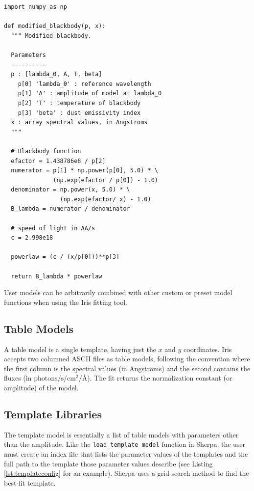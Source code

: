 \documentclass[preprint,authoryear,5p]{elsarticle}
\begin{document}
\begin{lstlisting}[style=python,
	caption={Example of a user-defined model that
can be dynamically loaded into Iris. The code, written as a Python function, 
implements a modified blackbody and can be combined 
in Iris with other built-in and custom components. Backslashes indicate line 
continuations.},
	label=lst:user_model_example]
import numpy as np

def modified_blackbody(p, x):
  """ Modified blackbody.

  Parameters
  ----------
  p : [lambda_0, A, T, beta]
    p[0] 'lambda_0' : reference wavelength
    p[1] 'A' : amplitude of model at lambda_0
    p[2] 'T' : temperature of blackbody
    p[3] 'beta' : dust emissivity index
  x : array spectral values, in Angstroms
  """

  # Blackbody function
  efactor = 1.438786e8 / p[2]
  numerator = p[1] * np.power(p[0], 5.0) * \
              (np.exp(efactor / p[0]) - 1.0)
  denominator = np.power(x, 5.0) * \
                (np.exp(efactor/ x) - 1.0)
  B_lambda = numerator / denominator

  # speed of light in AA/s
  c = 2.998e18

  powerlaw = (c / (x/p[0]))**p[3]

  return B_lambda * powerlaw
\end{lstlisting}

User models can be arbitrarily combined with other custom or preset model
functions when using the Iris fitting tool.

\subsection{Table Models} A table model is a single template, having just the
$x$ and $y$ coordinates. Iris accepts two columned ASCII files as table models,
following the convention where the first column is the spectral values (in
Angstroms) and the second contains the fluxes (in
$\mathrm{photons}/\mathrm{s}/\mathrm{cm}^{2}/\mbox{\AA}$). The fit returns the
normalization constant (or amplitude) of the model.

\begin{sloppypar}
\subsection{Template Libraries} The template model is essentially a list of
table models with parameters other than the amplitude. Like the
\texttt{load\_template\_model} function in Sherpa, the user must create an index
file that lists the parameter values of the templates and the full path to the
template those parameter values describe (see Listing \ref{lst:templateconfig}
for an example). Sherpa uses a grid-search method to find the best-fit template.
\end{sloppypar}
\end{document}
